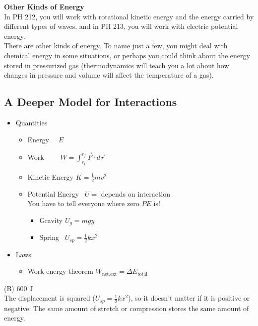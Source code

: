 \documentclass[]{article}
\begin{document}
\newpage
\begin{TeacherMargin}
\noindent\textbf{Other Kinds of Energy} \\
In PH 212, you will work with rotational kinetic energy and the energy carried by different types of waves, and in PH 213, you will work with electric potential energy. \\

\noindent There are other kinds of energy. To name just a few, you might deal with chemical energy in some situations, or perhaps you could think about the energy stored in pressurized gas (thermodynamics will teach you a lot about how changes in pressure and volume will affect the temperature of a gas).
\end{TeacherMargin}
\begin{PresentSpace}
\vspace{-10pt}
\section*{A Deeper Model for Interactions}
\vspace{-10pt}
\begin{itemize}
	\item Quantities
	\begin{itemize}
		\item Energy \qquad \qquad \qquad \quad \ \ $E$
		\item Work \qquad \qquad \qquad \quad \ \ \ \ $W = \int_{r_{i}}^{r_{f}}\vec{F}\cdot d\vec{r}$
		\item Kinetic Energy \qquad \qquad $K=\frac{1}{2}mv^{2}$
		\item Potential Energy \qquad \quad \ $U=$ depends on interaction \\
		You have to tell everyone where zero $PE$ is!
		\begin{itemize}
			\item Gravity \qquad $U_{g} = mgy$
			\item Spring \qquad \ $U_{sp} = \frac{1}{2}kx^{2}$
		\end{itemize}
	\end{itemize}
	\item Laws
	\begin{itemize}
		\item Work-energy theorem \quad $W_{\text{net,ext}} = \Delta E_{\text{total}}$
	\end{itemize}
\end{itemize}
\end{PresentSpace}
\newpage
\begin{TeacherMargin}
\noindent (B) 600 J \\
The displacement is squared ($U_{sp}=\frac{1}{2}kx^{2}$), so it doesn't matter if it is positive or negative. The same amount of stretch or compression stores the same amount of energy.
\end{TeacherMargin}
\end{document}

